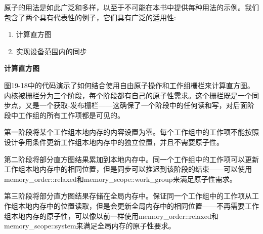 原子的用法是如此广泛和多样，以至于不可能在本书中提供每种用法的示例。我们包含了两个具有代表性的例子，它们具有广泛的适用性:\par
	
\begin{enumerate}
	\item 计算直方图
	\item 实现设备范围内的同步
\end{enumerate}

\hspace*{\fill} \par %
\textbf{计算直方图}

图19-18中的代码演示了如何结合使用自由原子操作和工作组栅栏来计算直方图。内核被栅栏分为三个阶段，每个阶段都有自己的原子性需求。这个栅栏既是一个同步点，又是一个获取-发布栅栏——这确保了一个阶段中的任何读和写，对后面阶段中工作组的所有工作项都是可见的。\par

第一阶段将某个工作组本地内存的内容设置为零。每个工作组中的工作项不能按照设计争用条件更新工作组本地内存中的独立位置，并且不需要原子性。\par

第二阶段将部分直方图结果累加到本地内存中。同一个工作组中的工作项可以更新工作组本地内存中的相同位置，但是同步可以推迟到该阶段的结束——可以使用memory\_order::relaxed和memory\_scope::work\_group来满足原子性需求。\par

第三阶段将部分直方图结果存储在全局内存中。保证同一个工作组中的工作项从工作组本地内存中的位置读取，但是会更新全局内存中的相同位置——不再需要工作组本地内存的原子性，可以像以前一样使用memory\_order::relaxed和memory\_scope::system来满足全局内存的原子性要求。\par

